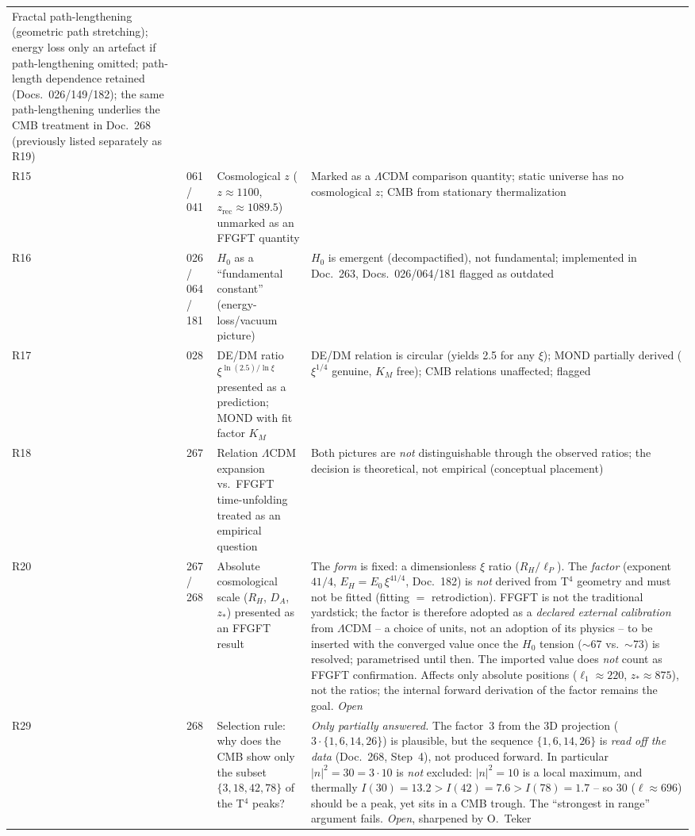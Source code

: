 {\begin{longtable}{p{0.6cm}p{2.4cm}p{5.5cm}p{5.5cm}}
  Fractal path-lengthening (geometric path stretching); energy loss only an artefact if path-lengthening omitted; path-length dependence retained (Docs.~026/149/182); the same path-lengthening underlies the CMB treatment in Doc.~268 (previously listed separately as R19) \\[3pt]
R15 & 061 / 041 &
  Cosmological $z$ ($z\approx 1100$, $z_{\text{rec}}\approx 1089.5$) unmarked as an FFGFT quantity &
  Marked as a $\Lambda$CDM comparison quantity; static universe has no cosmological $z$; CMB from stationary thermalization \\[3pt]
R16 & 026 / 064 / 181 &
  $H_0$ as a \enquote{fundamental constant} (energy-loss/vacuum picture) &
  $H_0$ is emergent (decompactified), not fundamental; implemented in Doc.~263, Docs.~026/064/181 flagged as outdated \\[3pt]
R17 & 028 &
  DE/DM ratio $\xi^{\ln(2.5)/\ln\xi}$ presented as a prediction; MOND with fit factor $K_M$ &
  DE/DM relation is circular (yields 2.5 for any $\xi$); MOND partially derived ($\xi^{1/4}$ genuine, $K_M$ free); CMB relations unaffected; flagged \\[3pt]
R18 & 267 &
  Relation $\Lambda$CDM expansion vs.\ FFGFT time-unfolding treated as an empirical question &
  Both pictures are \emph{not} distinguishable through the observed ratios; the decision is theoretical, not empirical (conceptual placement) \\[3pt]
R20 & 267 / 268 &
  Absolute cosmological scale ($R_H$, $D_A$, $z_*$) presented as an FFGFT result &
  The \emph{form} is fixed: a dimensionless $\xi$ ratio ($R_H/\ell_P$). The \emph{factor} (exponent $41/4$, $E_H = E_0\,\xi^{41/4}$, Doc.~182) is \emph{not} derived from T$^4$ geometry and must not be fitted (fitting $=$ retrodiction). FFGFT is not the traditional yardstick; the factor is therefore adopted as a \emph{declared external calibration} from $\Lambda$CDM -- a choice of units, not an adoption of its physics -- to be inserted with the converged value once the $H_0$ tension ($\sim$67 vs.\ $\sim$73) is resolved; parametrised until then. The imported value does \emph{not} count as FFGFT confirmation. Affects only absolute positions ($\ell_1\approx220$, $z_*\approx875$), not the ratios; the internal forward derivation of the factor remains the goal. \emph{Open} \\[3pt]
R29 & 268 &
  Selection rule: why does the CMB show only the subset $\{3,18,42,78\}$ of the T$^4$ peaks? &
  \emph{Only partially answered.} The factor~3 from the 3D projection ($3\cdot\{1,6,14,26\}$) is plausible, but the sequence $\{1,6,14,26\}$ is \emph{read off the data} (Doc.~268, Step~4), not produced forward. In particular $|n|^2=30=3\cdot10$ is \emph{not} excluded: $|n|^2=10$ is a local maximum, and thermally $I(30)=13.2 > I(42)=7.6 > I(78)=1.7$ -- so $30$ ($\ell\approx696$) should be a peak, yet sits in a CMB trough. The ``strongest in range'' argument fails. \emph{Open}, sharpened by O.~Teker \\[3pt]

\end{longtable}}
